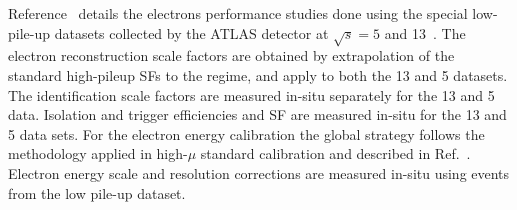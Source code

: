 
Reference~\cite{Xu:2657152} details the electrons performance studies done using the special low-pile-up datasets collected by the ATLAS detector at
$\sqrt{s} = 5$ and 13~\TeV.
The electron reconstruction scale factors are obtained by extrapolation of the standard high-pileup SFs to the \lowmu regime, and apply to both the 13 and 5 \TeV{} datasets. The identification scale factors are measured in-situ separately for the 13 and 5 \TeV{} data.
Isolation and trigger efficiencies and SF are measured in-situ for the 13 and 5 \TeV{} data sets.
For the electron energy calibration the global strategy follows the methodology applied in high-$\mu$ standard calibration and described in Ref.~\cite{Aad:2019tso}.
Electron energy scale and resolution corrections are measured in-situ using \Zee events from the low pile-up dataset. 
